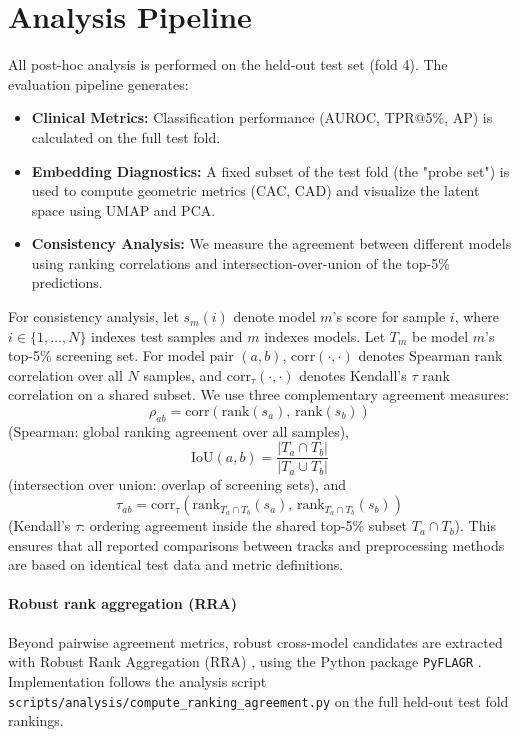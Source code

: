 \section{Analysis Pipeline}
All post-hoc analysis is performed on the held-out test set (fold 4).
The evaluation pipeline generates:
\begin{itemize}
  \item \textbf{Clinical Metrics:} Classification performance (AUROC, TPR@5\%, AP) is calculated on the full test fold.
  \item \textbf{Embedding Diagnostics:} A fixed subset of the test fold (the "probe set") is used to compute geometric metrics (CAC, CAD) and visualize the latent space using UMAP and PCA.
  \item \textbf{Consistency Analysis:} We measure the agreement between different models using ranking correlations and intersection-over-union of the top-5\% predictions.
\end{itemize}
For consistency analysis, let \(s_m(i)\) denote model \(m\)'s score for sample \(i\), where \(i\in\{1,\dots,N\}\) indexes test samples and \(m\) indexes models.
Let \(T_m\) be model \(m\)'s top-5\% screening set.
For model pair \((a,b)\), \(\mathrm{corr}(\cdot,\cdot)\) denotes Spearman rank correlation over all \(N\) samples, and \(\mathrm{corr}_{\tau}(\cdot,\cdot)\) denotes Kendall's \(\tau\) rank correlation on a shared subset.
We use three complementary agreement measures:
\[
  \rho_{ab}=\mathrm{corr}\!\left(\mathrm{rank}(s_a),\,\mathrm{rank}(s_b)\right)
\]
(Spearman: global ranking agreement over all samples),
\[
  \mathrm{IoU}(a,b)=\frac{|T_a\cap T_b|}{|T_a\cup T_b|}
\]
(intersection over union: overlap of screening sets), and
\[
  \tau_{ab}=\mathrm{corr}_{\tau}\!\left(\mathrm{rank}_{T_a\cap T_b}(s_a),\,\mathrm{rank}_{T_a\cap T_b}(s_b)\right)
\]
(Kendall's \(\tau\): ordering agreement inside the shared top-5\% subset \(T_a\cap T_b\)).
This ensures that all reported comparisons between tracks and preprocessing methods are based on identical test data and metric definitions.

\paragraph*{Robust rank aggregation (RRA)}
Beyond pairwise agreement metrics, robust cross-model candidates are extracted with Robust Rank Aggregation (RRA) \parencite{rra_kolde_2012}, using the Python package \texttt{PyFLAGR} \parencite{pyflagr_2023}.
Implementation follows the analysis script \texttt{scripts/analysis/compute\_ranking\_agreement.py} on the full held-out test fold rankings.

